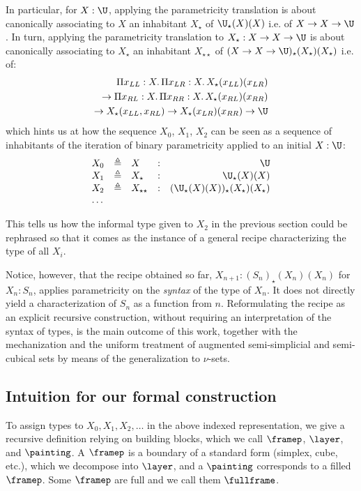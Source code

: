 \documentclass[10pt]{art.cls/art}
\newcommand{\defeq}{\ensuremath{\triangleq}}
\newcommand{\kstar}{{\star}}
\begin{document}
In particular, for $X: \U$, applying the parametricity translation is about canonically associating to $X$ an inhabitant $X_\kstar$ of ${\U}_\kstar(X)(X)$ i.e. of $X \rightarrow X \rightarrow \U$. In turn, applying the parametricity translation to $X_\kstar: X \rightarrow X \rightarrow \U$ is about canonically associating to $X_\kstar$ an inhabitant $X_{\kstar\kstar}$ of $(X \rightarrow X \rightarrow \U)_\kstar(X_\kstar)(X_\kstar)$ i.e. of:
\begin{align*}
  \Pi x_{LL}: X.\, \Pi x_{LR}: X.\, X_\kstar(x_{LL})(x_{LR})             \\
  \rightarrow \Pi x_{RL}: X.\, \Pi x_{RR}: X.\, X_\kstar(x_{RL})(x_{RR}) \\ \rightarrow X_\kstar(x_{LL}, x_{RL}) \rightarrow X_\kstar(x_{LR})(x_{RR})  \rightarrow \U
\end{align*}
which hints us at how the sequence $X_0$, $X_1$, $X_2$ can be seen as a sequence of inhabitants of the iteration of binary parametricity applied to an initial $X: \U$:
\begin{equation*}
  \begin{array}{llllr}
    X_0 & \defeq & X                & : & \U                                               \\
    X_1 & \defeq & X_\kstar         & : & {\U}_\kstar(X)(X)                                \\
    X_2 & \defeq & X_{\kstar\kstar} & : & ({\U}_\kstar(X)(X))_{\kstar}(X_\kstar)(X_\kstar) \\
    \ldots
  \end{array}
\end{equation*}

This tells us how the informal type given to $X_2$ in the previous section could be rephrased so that it comes as the instance of a general recipe characterizing the type of all $X_i$.

Notice, however, that the recipe obtained so far, $X_{n + 1}: ({S_n})_\kstar(X_n)(X_n)$ for $X_n: S_n$, applies parametricity on the \emph{syntax} of the type of $X_n$. It does not directly yield a characterization of $S_n$ as a function from $n$. Reformulating the recipe as an explicit recursive construction, without requiring an interpretation of the syntax of types, is the main outcome of this work, together with the mechanization and the uniform treatment of augmented semi-simplicial and semi-cubical sets by means of the generalization to $\nu$-sets.

\subsection{Intuition for our formal construction}
To assign types to $X_0, X_1, X_2, \ldots$ in the above indexed representation, we give a recursive definition relying on building blocks, which we call $\framep$, $\layer$, and $\painting$. A $\framep$ is a boundary of a standard form (simplex, cube, etc.), which we decompose into $\layer$, and a $\painting$ corresponds to a filled $\framep$. Some $\framep$ are full and we call them $\fullframe$.
\end{document}
